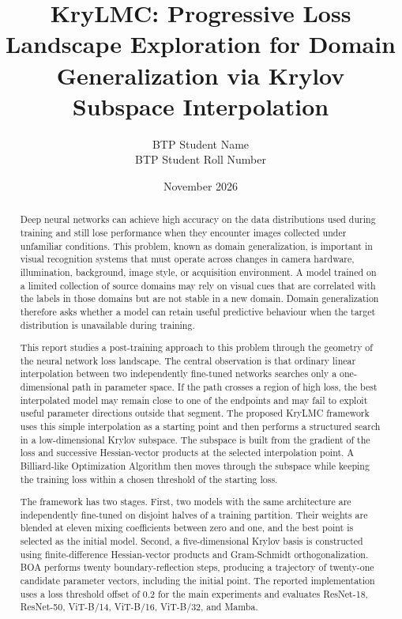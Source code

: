 \documentclass[11pt,a4paper]{article}
\title{\textbf{KryLMC: Progressive Loss Landscape Exploration for Domain Generalization via Krylov Subspace Interpolation}}
\author{BTP Student Name\\BTP Student Roll Number}
\date{November 2026}
\begin{document}
\maketitle
\begingroup
\small
\tableofcontents
\endgroup
\newpage

\renewcommand{\abstractname}{1 Abstract}
\begin{abstract}
Deep neural networks can achieve high accuracy on the data distributions used during training and still lose performance when they encounter images collected under unfamiliar conditions. This problem, known as domain generalization, is important in visual recognition systems that must operate across changes in camera hardware, illumination, background, image style, or acquisition environment. A model trained on a limited collection of source domains may rely on visual cues that are correlated with the labels in those domains but are not stable in a new domain. Domain generalization therefore asks whether a model can retain useful predictive behaviour when the target distribution is unavailable during training.

This report studies a post-training approach to this problem through the geometry of the neural network loss landscape. The central observation is that ordinary linear interpolation between two independently fine-tuned networks searches only a one-dimensional path in parameter space. If the path crosses a region of high loss, the best interpolated model may remain close to one of the endpoints and may fail to exploit useful parameter directions outside that segment. The proposed KryLMC framework uses this simple interpolation as a starting point and then performs a structured search in a low-dimensional Krylov subspace. The subspace is built from the gradient of the loss and successive Hessian-vector products at the selected interpolation point. A Billiard-like Optimization Algorithm then moves through the subspace while keeping the training loss within a chosen threshold of the starting loss.

The framework has two stages. First, two models with the same architecture are independently fine-tuned on disjoint halves of a training partition. Their weights are blended at eleven mixing coefficients between zero and one, and the best point is selected as the initial model. Second, a five-dimensional Krylov basis is constructed using finite-difference Hessian-vector products and Gram-Schmidt orthogonalization. BOA performs twenty boundary-reflection steps, producing a trajectory of twenty-one candidate parameter vectors, including the initial point. The reported implementation uses a loss threshold offset of 0.2 for the main experiments and evaluates ResNet-18, ResNet-50, ViT-B/14, ViT-B/16, ViT-B/32, and Mamba.


\end{abstract}
\end{document}
